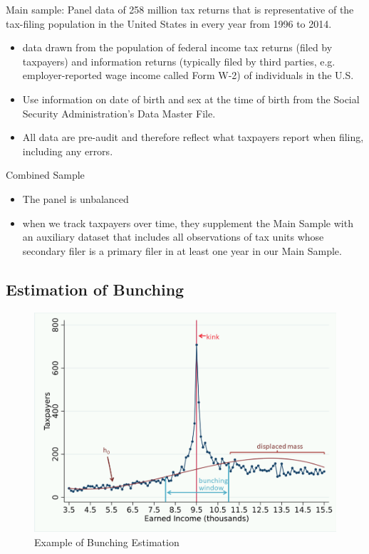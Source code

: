 \documentclass[../root]{subfiles}
\begin{document}
    Main sample: Panel data of 258 million tax returns that is representative of the tax-filing population in the United States in every year from 1996 to 2014.
    \begin{itemize}
        \item data drawn from the population of federal income tax returns (filed by taxpayers) and information returns (typically filed by third parties, e.g. employer-reported wage income called Form W-2) of individuals in the U.S.
        \item Use information on date of birth and sex at the time of birth from the Social Security Administration's Data Master File.
        \item All data are pre-audit and therefore reflect what taxpayers report when filing, including any errors.
    \end{itemize}
    Combined Sample
    \begin{itemize}
        \item The panel is unbalanced
        \item when we track taxpayers over time, they supplement the Main Sample with an auxiliary dataset that includes all observations of tax units whose secondary filer is a primary filer in at least one year in our Main Sample.
    \end{itemize}

    \subsection{Estimation of Bunching}

    \begin{figure}[t]
        \centering
        \includegraphics[width = 0.8\linewidth]{0626kato/fig3.PNG}
        \caption{Example of Bunching Estimation}
        \label{}
    \end{figure}
    
\end{document}
